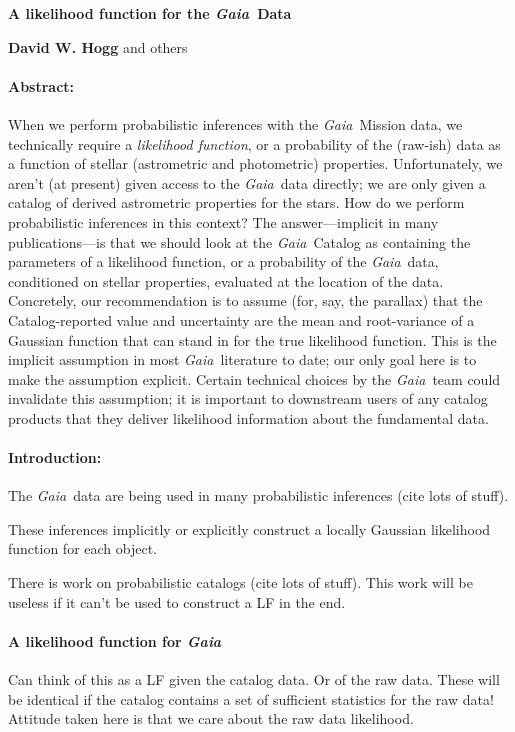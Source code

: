 \documentclass[12pt]{article}
\newcommand{\Gaia}{\textsl{Gaia}}
\begin{document}
\noindent
\textbf{A likelihood function for the \Gaia\ Data}
\bigskip

\noindent
\textbf{David W. Hogg} and others

\paragraph{Abstract:}
When we perform probabilistic inferences with the \Gaia\ Mission data,
we technically require
a \emph{likelihood function}, or a probability of the (raw-ish) data as a function
of stellar (astrometric and photometric) properties.
Unfortunately, we aren't (at present) given access to the \Gaia\ data
directly;
we are only given a catalog of derived astrometric properties for the stars.
How do we perform probabilistic inferences in this context?
The answer---implicit in many publications---is that we should look at the
\Gaia\ Catalog as containing the parameters of a likelihood function, or
a probability of the \Gaia\ data, conditioned on stellar properties,
evaluated at the location of the data.
Concretely, our recommendation is to assume
(for, say, the parallax) that the Catalog-reported
value and uncertainty are the mean and root-variance of a Gaussian
function that can stand in for the true likelihood function.
This is the implicit assumption in most \Gaia\ literature to date;
our only goal here is to make the assumption explicit.
Certain technical choices by the \Gaia\ team could invalidate
this assumption; it is important to downstream users of any catalog products
that they deliver likelihood information about the fundamental
data.

\paragraph{Introduction:}
The \Gaia\ data are being used in many probabilistic inferences (cite lots of stuff).

These inferences implicitly or explicitly construct a locally Gaussian
likelihood function for each object.

There is work on probabilistic catalogs (cite lots of stuff). This work
will be useless if it can't be used to construct a LF in the end.

\paragraph{A likelihood function for \Gaia}
Can think of this as a LF given the catalog data. Or of the raw data.
These will be identical if the catalog contains a set of sufficient statistics
for the raw data!
Attitude taken here is that we care about the raw data likelihood.
\end{document}
